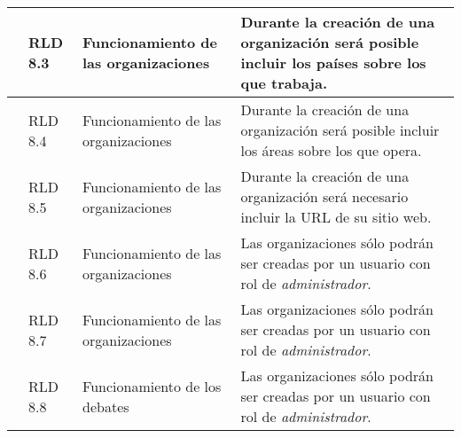 \begin{longtable}[c]{|p{1mm}|p{14mm}|p{30mm}|p{90mm}|}
\hline
& RLD 8.3 & Funcionamiento de las organizaciones & Durante la creación de una organización será posible incluir los países sobre los que trabaja. \\
\hline
& RLD 8.4 & Funcionamiento de las organizaciones & Durante la creación de una organización será posible incluir los áreas sobre los que opera. \\
\hline
& RLD 8.5 & Funcionamiento de las organizaciones & Durante la creación de una organización será necesario incluir la URL de su sitio web. \\
\hline
& RLD 8.6 & Funcionamiento de las organizaciones & Las organizaciones sólo podrán ser creadas por un usuario con rol de \textit{administrador}. \\
\hline
& RLD 8.7 & Funcionamiento de las organizaciones & Las organizaciones sólo podrán ser creadas por un usuario con rol de \textit{administrador}. \\
\hline
& RLD 8.8 & Funcionamiento de los debates & Las organizaciones sólo podrán ser creadas por un usuario con rol de \textit{administrador}. \\
\hline
\hline

 \end{longtable}
 
 
 
 
 
 
 
 
 
 
 
 
 
 
 
 
 
 
 
 
 